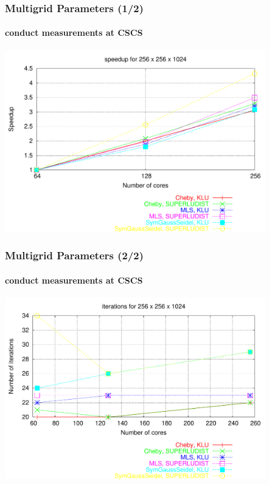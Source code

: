 \documentclass[xcolor=pdftex,table,10pt]{beamer}
\begin{document}
	\begin{frame}
		\frametitle{Multigrid Parameters (1/2)}
		\framesubtitle{conduct measurements at CSCS}

		\begin{center}
			\includegraphics[width=0.85\textwidth]{plots/speedup_256_256_1024_3.pdf}
		\end{center}

	\end{frame}
	
	\begin{frame}
		\frametitle{Multigrid Parameters (2/2)}
		\framesubtitle{conduct measurements at CSCS}

		\begin{center}
			\includegraphics[width=0.85\textwidth]{plots/iterations_256_256_1024_3.pdf}
		\end{center}

	\end{frame}

\end{document}
